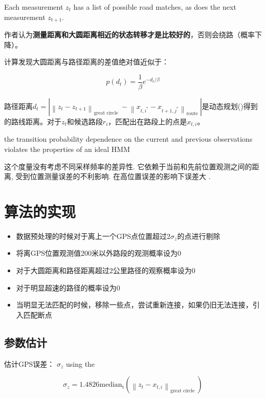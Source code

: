 Each measurement $ z_{t} $ has a list of possible road matches, as does the next measurement $ z_{t+1} $. 

作者认为\textbf{测量距离和大圆距离相近的状态转移才是比较好的}，否则会绕路（概率下降）。

计算发现大圆距离与路径距离的差值绝对值近似于：

$$ p\left(d_{t}\right)=\frac{1}{\beta} e^{-d_{t} / \beta} $$

路径距离$ d_{t}=\left|\left\|z_{t}-z_{t+1}\right\|_{\text {great circle }}-\left\|x_{t, i^{*}}-x_{t+1, j^{*}}\right\|_{\text {route }}\right| $是动态规划()得到的路线距离。对于$z_t$和候选路段$r_i$，匹配出在路段上的点是$ x_{t, i} $。

\begin{remark}
      \label{Comment:HMM-TransitionProbability}

      the transition probability
        dependence on the current and previous observations
    violates the properties of an ideal HMM

    这个度量没有考虑不同采样频率的差异性. 它依赖于当前和先前位置观测之间的距离, 受到位置测量误差的不利影响. 在高位置误差的影响下误差大 \cite{Jagadeesh2017}.
\end{remark}

\section{算法的实现}

\begin{itemize}
    \item 数据预处理的时候对于离上一个GPS点位置超过$ 2 \sigma_{z} $的点进行剔除
    \item 将离GPS位置观测值200米以外路段的观测概率设为0
    \item 对于大圆距离和路径距离超过2公里路径的观察概率设为0
    \item 对于明显超速的路径的概率设为0
    \item 当明显无法匹配的时候，移除一些点，尝试重新连接，如果仍旧无法连接，引入匹配断点
\end{itemize}

\subsection{参数估计}

估计GPS误差：
$ \sigma_{z} $ using the 

$$ \sigma_{z}=1.4826 \mathrm{median}_{\mathrm{t}}\left(\left\|z_{t}-x_{t, i}\right\|_{\text {great circle }}\right) $$

